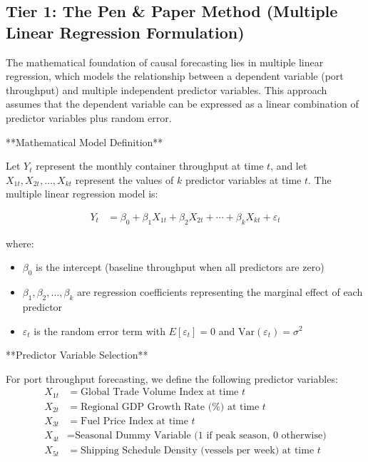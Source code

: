 \documentclass{article}
\begin{document}
\subsection{Tier 1: The Pen \& Paper Method (Multiple Linear Regression Formulation)}

The mathematical foundation of causal forecasting lies in multiple linear regression, which models the relationship between a dependent variable (port throughput) and multiple independent predictor variables. This approach assumes that the dependent variable can be expressed as a linear combination of predictor variables plus random error.

**Mathematical Model Definition**

Let $Y_t$ represent the monthly container throughput at time $t$, and let $X_{1t}, X_{2t}, \ldots, X_{kt}$ represent the values of $k$ predictor variables at time $t$. The multiple linear regression model is:

\begin{align}
Y_t &= \beta_0 + \beta_1 X_{1t} + \beta_2 X_{2t} + \cdots + \beta_k X_{kt} + \varepsilon_t
\end{align}

where:
\begin{itemize}
\item $\beta_0$ is the intercept (baseline throughput when all predictors are zero)
\item $\beta_1, \beta_2, \ldots, \beta_k$ are regression coefficients representing the marginal effect of each predictor
\item $\varepsilon_t$ is the random error term with $E[\varepsilon_t] = 0$ and $\text{Var}(\varepsilon_t) = \sigma^2$
\end{itemize}

**Predictor Variable Selection**

For port throughput forecasting, we define the following predictor variables:
\begin{align}
X_{1t} &= \text{Global Trade Volume Index at time } t \\
X_{2t} &= \text{Regional GDP Growth Rate (\%) at time } t \\
X_{3t} &= \text{Fuel Price Index at time } t \\
X_{4t} &= \text{Seasonal Dummy Variable (1 if peak season, 0 otherwise)} \\
X_{5t} &= \text{Shipping Schedule Density (vessels per week) at time } t
\end{align}
\end{document}
